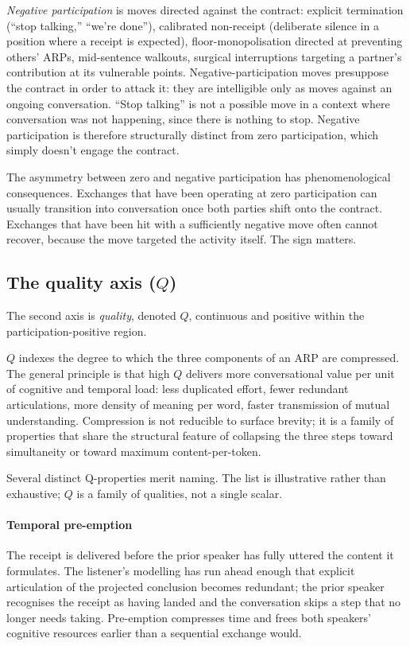 \emph{Negative participation} is moves directed against the contract: explicit termination (``stop talking,'' ``we're done''), calibrated non-receipt (deliberate silence in a position where a receipt is expected), floor-monopolisation directed at preventing others' ARPs, mid-sentence walkouts, surgical interruptions targeting a partner's contribution at its vulnerable points. Negative-participation moves presuppose the contract in order to attack it: they are intelligible only as moves against an ongoing conversation. ``Stop talking'' is not a possible move in a context where conversation was not happening, since there is nothing to stop. Negative participation is therefore structurally distinct from zero participation, which simply doesn't engage the contract.

The asymmetry between zero and negative participation has phenomenological consequences. Exchanges that have been operating at zero participation can usually transition into conversation once both parties shift onto the contract. Exchanges that have been hit with a sufficiently negative move often cannot recover, because the move targeted the activity itself. The sign matters.

\subsection{The quality axis ($Q$)}

The second axis is \emph{quality}, denoted $Q$, continuous and positive within the participation-positive region.

$Q$ indexes the degree to which the three components of an ARP are compressed. The general principle is that high $Q$ delivers more conversational value per unit of cognitive and temporal load: less duplicated effort, fewer redundant articulations, more density of meaning per word, faster transmission of mutual understanding. Compression is not reducible to surface brevity; it is a family of properties that share the structural feature of collapsing the three steps toward simultaneity or toward maximum content-per-token.

Several distinct Q-properties merit naming. The list is illustrative rather than exhaustive; $Q$ is a family of qualities, not a single scalar.

\paragraph{Temporal pre-emption} The receipt is delivered before the prior speaker has fully uttered the content it formulates. The listener's modelling has run ahead enough that explicit articulation of the projected conclusion becomes redundant; the prior speaker recognises the receipt as having landed and the conversation skips a step that no longer needs taking. Pre-emption compresses time and frees both speakers' cognitive resources earlier than a sequential exchange would.

